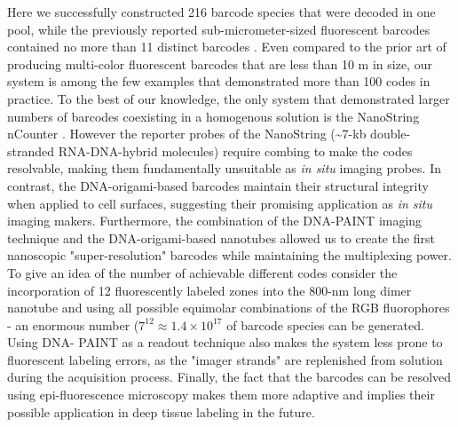 Here we successfully constructed 216 barcode species that 
were decoded in one pool, while the previously reported sub-micrometer-sized 
fluorescent barcodes contained no more than 11 distinct barcodes \citep{li_multiplexed_2005, fournier-bidoz_facile_2008, li_controlled_2010, levsky_single-cell_2002}. Even compared 
to the prior art of producing multi-color fluorescent barcodes that are less than 10 \textmu m in 
size, our system is among the few examples \citep{fournier-bidoz_facile_2008, geiss_direct_2008} that demonstrated more than 100 codes in 
practice. To the best of our knowledge, the only system that demonstrated larger numbers 
of barcodes coexisting in a homogenous solution is the NanoString nCounter \citep{ geiss_direct_2008}. However 
the reporter probes of the NanoString (\textasciitilde7-kb double-stranded RNA-DNA-hybrid 
molecules) require combing to make the codes resolvable, making them fundamentally 
unsuitable as \textit{in situ} imaging probes. In contrast, the DNA-origami-based barcodes 
maintain their structural integrity when applied to cell surfaces, suggesting their 
promising application as \textit{in situ} imaging makers. Furthermore, the combination of the 
DNA-PAINT imaging technique and the DNA-origami-based nanotubes allowed us to 
create the first nanoscopic "super-resolution" barcodes while maintaining the 
multiplexing power. To give an idea of the number of achievable different codes  
consider the incorporation of 12 fluorescently labeled zones into the 800-nm long dimer 
nanotube and using all possible equimolar combinations of the RGB fluorophores - an 
enormous number ($7^{12}\approx 1.4  \times 10^17$ of barcode
species can be generated. Using DNA- 
PAINT as a readout technique also makes the system less prone to fluorescent labeling 
errors, as the "imager strands" are replenished from solution during the acquisition 
process. Finally, the fact that the barcodes can be resolved using epi-fluorescence 
microscopy makes them more adaptive and implies their possible application in deep 
tissue labeling in the future. 

